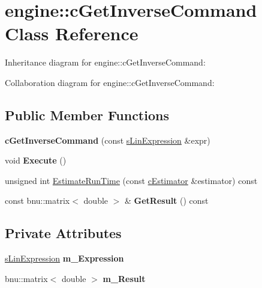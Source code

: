 \hypertarget{classengine_1_1cGetInverseCommand}{\section{engine\-:\-:c\-Get\-Inverse\-Command Class Reference}
\label{classengine_1_1cGetInverseCommand}
}


Inheritance diagram for engine\-:\-:c\-Get\-Inverse\-Command\-:


Collaboration diagram for engine\-:\-:c\-Get\-Inverse\-Command\-:
\subsection*{Public Member Functions}
\begin{DoxyCompactItemize}
\item 
\hypertarget{classengine_1_1cGetInverseCommand_a384a4d0430c07551540f088a52a88dcf}{{\bfseries c\-Get\-Inverse\-Command} (const \hyperlink{structengine_1_1sLinExpression}{s\-Lin\-Expression} \&expr)}\label{classengine_1_1cGetInverseCommand_a384a4d0430c07551540f088a52a88dcf}

\item 
\hypertarget{classengine_1_1cGetInverseCommand_a064982635b21c3cd7a4819300f2afdca}{void {\bfseries Execute} ()}\label{classengine_1_1cGetInverseCommand_a064982635b21c3cd7a4819300f2afdca}

\item 
unsigned int \hyperlink{classengine_1_1cGetInverseCommand_a1ed3cfe7f5d5ec7025da86522d2c69cf}{Estimate\-Run\-Time} (const \hyperlink{classengine_1_1cEstimator}{c\-Estimator} \&estimator) const 
\item 
\hypertarget{classengine_1_1cGetInverseCommand_ac68eef2676cf35bf1ca7c28c6dc94b63}{const bnu\-::matrix$<$ double $>$ \& {\bfseries Get\-Result} () const }\label{classengine_1_1cGetInverseCommand_ac68eef2676cf35bf1ca7c28c6dc94b63}

\end{DoxyCompactItemize}
\subsection*{Private Attributes}
\begin{DoxyCompactItemize}
\item 
\hypertarget{classengine_1_1cGetInverseCommand_a771b16c03fd8d182633108101756e45d}{\hyperlink{structengine_1_1sLinExpression}{s\-Lin\-Expression} {\bfseries m\-\_\-\-Expression}}\label{classengine_1_1cGetInverseCommand_a771b16c03fd8d182633108101756e45d}

\item 
\hypertarget{classengine_1_1cGetInverseCommand_add6d20d33ad723eeedc3ce95721fdbf1}{bnu\-::matrix$<$ double $>$ {\bfseries m\-\_\-\-Result}}\label{classengine_1_1cGetInverseCommand_add6d20d33ad723eeedc3ce95721fdbf1}

\end{DoxyCompactItemize}


